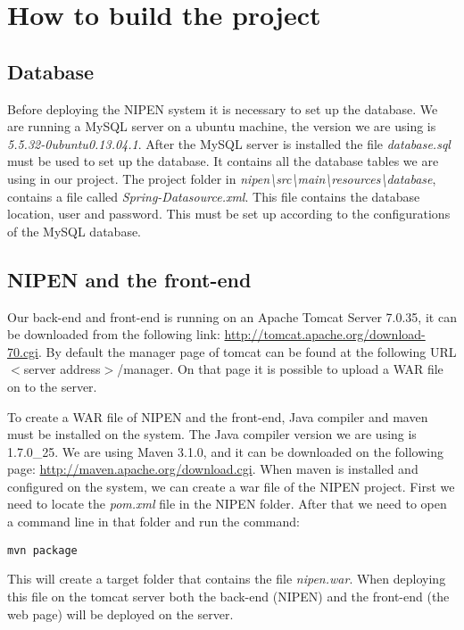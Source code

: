 \chapter{How to build the project}
\label{AppendixB}

\section{Database}

Before deploying the NIPEN system it is necessary to set up the database.
We are running a MySQL server on a ubuntu machine, the version we are using is \textit{5.5.32-0ubuntu0.13.04.1}.
After the MySQL server is installed the file \textit{database.sql} must be used to set up the database.
It contains all the database tables we are using in our project.
The project folder in \textit{nipen\textbackslash src\textbackslash main\textbackslash resources\textbackslash database}, contains a file called \textit{Spring-Datasource.xml}.
This file contains the database location, user and password.
This must be set up according to the configurations of the MySQL database.

\section{NIPEN and the front-end}

Our back-end and front-end is running on an Apache Tomcat Server 7.0.35, it can be downloaded from the following link: \href{http://tomcat.apache.org/download-70.cgi}{http://tomcat.apache.org/download-70.cgi}.
By default the manager page of tomcat can be found at the following URL $<$server address$>$/manager.
On that page it is possible to upload a WAR file on to the server.

To create a WAR file of NIPEN and the front-end, Java compiler and maven must be installed on the system.
The Java compiler version we are using is 1.7.0\_25.
We are using Maven 3.1.0, and it can be downloaded on the following page: \href{http://maven.apache.org/download.cgi}{http://maven.apache.org/download.cgi}.
When maven is installed and configured on the system, we can create a war file of the NIPEN project.
First we need to locate the \textit{pom.xml} file in the NIPEN folder.
After that we need to open a command line in that folder and run the command: \begin{verbatim}
mvn package
\end{verbatim}
This will create a target folder that contains the file \textit{nipen.war}.
When deploying this file on the tomcat server both the back-end (NIPEN) and the front-end (the web page) will be deployed on the server.


